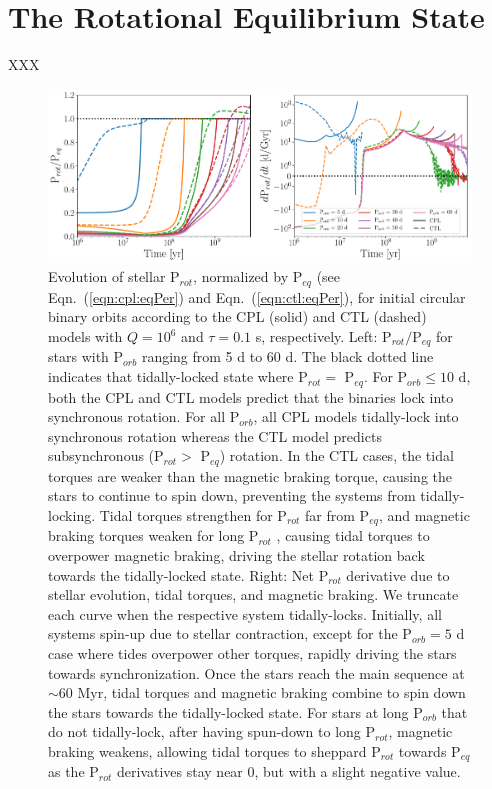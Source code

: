 \documentclass[twocolumn]{aastex61}
\begin{document}

\section{The Rotational Equilibrium State} \label{sec:eq}

XXX

\begin{figure}
	\includegraphics[width=\textwidth]{../Plots/eqPerTwoPanel.pdf}
   \caption{Evolution of stellar P$_{rot}$, normalized by P$_{eq}$ (see Eqn.~(\ref{eqn:cpl:eqPer}) and Eqn.~(\ref{eqn:ctl:eqPer}), for initial circular binary orbits according to the CPL (solid) and CTL (dashed) models with $Q = 10^6$ and $\tau = 0.1$ s, respectively. Left: P$_{rot}/$P$_{eq}$ for stars with P$_{orb}$ ranging from 5 d to 60 d. The black dotted line indicates that tidally-locked state where P$_{rot} = $ P$_{eq}$.  For P$_{orb} \leq 10$ d, both the CPL and CTL models predict that the binaries lock into synchronous rotation.  For all P$_{orb}$, all CPL models tidally-lock into synchronous rotation whereas the CTL model predicts subsynchronous (P$_{rot} > $ P$_{eq}$) rotation. In the CTL cases, the tidal torques are weaker than the magnetic braking torque, causing the stars to continue to spin down, preventing the systems from tidally-locking.  Tidal torques strengthen for P$_{rot}$ far from P$_{eq}$, and magnetic braking torques weaken for long P$_{rot}$ \citep{Kawaler1988,Matt2015}, causing tidal torques to overpower magnetic braking, driving the stellar rotation back towards the tidally-locked state.  Right: Net P$_{rot}$ derivative due to stellar evolution, tidal torques, and magnetic braking.  We truncate each curve when the respective system tidally-locks.  Initially, all systems spin-up due to stellar contraction, except for the P$_{orb} = 5$ d case where tides overpower other torques, rapidly driving the stars towards synchronization. Once the stars reach the main sequence at ${\sim} 60$ Myr, tidal torques and magnetic braking combine to spin down the stars towards the tidally-locked state. For stars at long P$_{orb}$ that do not tidally-lock, after having spun-down to long P$_{rot}$, magnetic braking weakens, allowing tidal torques to sheppard P$_{rot}$ towards P$_{eq}$ as the P$_{rot}$ derivatives stay near 0, but with a slight negative value.}%
    \label{fig:eqPer}%
\end{figure}
\end{document}
